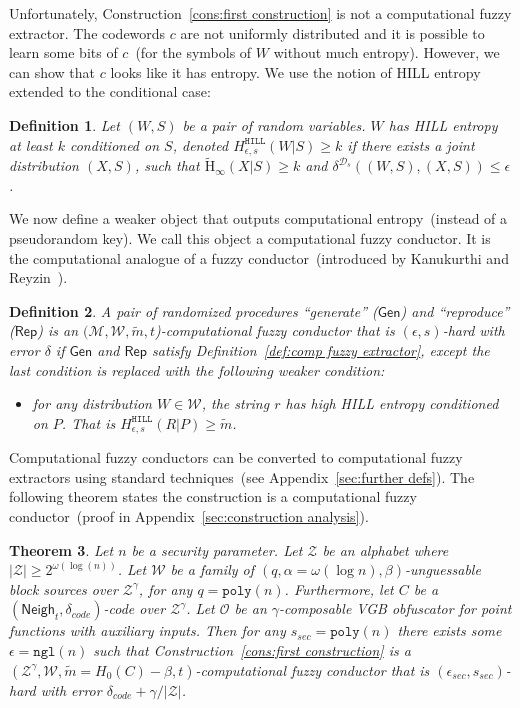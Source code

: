 \documentclass[11pt]{article}
\newcommand{\apref}[1]{\mbox{Appendix~\ref{#1}}}
\newcommand{\defref}[1]{\mbox{Definition~\ref{#1}}}
\newcommand{\consref}[1]{\mbox{Construction~\ref{#1}}}
\newcommand{\class}[1]{{\ensuremath{\mathsf{#1}}}}
\newcommand{\gen}{\ensuremath{\class{Gen}}\xspace}
\newcommand{\rep}{\ensuremath{\class{Rep}}\xspace}
\newcommand{\neigh}{\ensuremath{\class{Neigh}}\xspace}
\newcommand{\hill}{\ensuremath{\mathtt{HILL}}\xspace}
\newcommand{\poly}{\ensuremath{\mathtt{poly}}\xspace}
\newcommand{\ngl}{\ensuremath{\mathtt{ngl}}\xspace}
\newcommand{\Hav}{\tilde{\mathrm{H}}_\infty}
\newtheorem{theorem}{Theorem}[section]
\newtheorem{definition}[theorem]{Definition}
\begin{document}
Unfortunately, \consref{cons:first construction} is not a computational fuzzy extractor.  The codewords $c$ are not uniformly distributed and it is possible to learn some bits of $c$~(for the symbols of $W$ without much entropy).  However, we can show that $c$ looks like it has entropy.  We use the notion of HILL entropy~\cite{DBLP:journals/siamcomp/HastadILL99} extended to the conditional case:
\begin{definition}
\label{def:hill ent}
Let $(W, S)$ be a pair of random variables.  $W$ has
\emph{HILL entropy} at least $k$ conditioned on $S$,
denoted $H^{\hill}_{\epsilon, s}(W|S)\geq k$ if there exists a joint distribution $(X, S)$, such that $\Hav(X|S)\geq k$ and $\delta^{\mathcal{D}_{s}} ((W, S),(X,S))\leq \epsilon$.
\end{definition}
We now define a weaker object that outputs computational entropy~(instead of a pseudorandom key).  We call this object a computational fuzzy conductor.  It is the computational analogue of a fuzzy conductor~(introduced by Kanukurthi and Reyzin~\cite{KanukurthiR09}).
\begin{definition}
\label{def:comp fuzzy cond}
A pair of randomized procedures ``generate'' ($\gen$) and ``reproduce'' ($\rep$) is an $(\mathcal{M}, \mathcal{W}, \tilde{m}, t$)-computational fuzzy conductor that is $(\epsilon, s)$-hard with error $\delta$ if $\gen$ and $\rep$ satisfy \defref{def:comp fuzzy extractor}, except the last condition is replaced with the following weaker condition:
\begin{itemize}
\item for any distribution $W\in \mathcal{W}$, the string $r$ has high HILL entropy conditioned on $P$.  That is $H^{\hill}_{\epsilon, s}(R |P)\geq \tilde{m}$.
\end{itemize}
\end{definition}
Computational fuzzy conductors can be converted to computational fuzzy extractors using standard techniques~(see \apref{sec:further defs}).
The following theorem states the construction is a computational fuzzy conductor~(proof in \apref{sec:construction analysis}).
\begin{theorem}
\label{thm:main thm first cons}
Let $n$ be a security parameter. Let $\mathcal{Z}$ be an alphabet where $|\mathcal{Z}| \ge 2^{ \omega(\log(n))}$.
Let $\mathcal{W}$ be a family of $(q,\alpha= \omega(\log n),  \beta)$-unguessable block sources over $\mathcal{Z}^\gamma$, for any $q = \poly(n)$.  Furthermore, let $C$ be a $(\neigh_t, \delta_{code})$-code over $\mathcal{Z}^\gamma$.  Let $\mathcal{O}$ be an $\gamma$-composable VGB obfuscator for point functions with auxiliary inputs. Then for any $s_{sec} = \poly(n)$ there exists some $\epsilon=\ngl(n)$ such that \consref{cons:first construction} is a $(\mathcal{Z}^\gamma, \mathcal{W}, \tilde{m}=H_0(C)-\beta, t)$-computational fuzzy conductor that is $(\epsilon_{sec}, s_{sec})$-hard with error $\delta_{code} + \gamma/|\mathcal{Z}|$.
\end{theorem}
\end{document}
